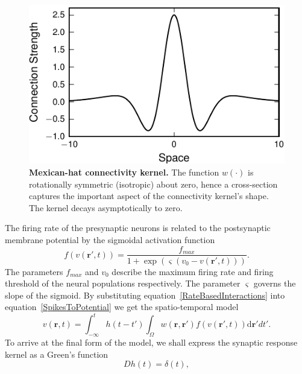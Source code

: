 \documentclass[10pt]{article}
\begin{document}
\begin{figure}
   	\begin{center}
   		\includegraphics{./Graph/Cross_section_kernel.pdf} 
   	\end{center}
   	\caption{{\bf Mexican-hat connectivity kernel.} The function $w(\cdot)$ is rotationally symmetric (isotropic) about zero, hence a cross-section captures the important aspect of the connectivity kernel's shape. The kernel decays asymptotically to zero.}
 	\label{fig:2d_kernel}
   \end{figure}
The firing rate of the presynaptic neurons is related to the postsynaptic membrane potential by the sigmoidal activation function 
\begin{equation}
	\label{ActivationFunction} f\left( v\left( \mathbf{r}', t \right) \right) = \frac{f_{max}}{1 + \exp \left( \varsigma \left( v_0 - v\left(\mathbf{r}',t\right) \right) \right)}. 
\end{equation}
The parameters $f_{max}$ and $v_0$ describe the maximum firing rate and firing threshold of the neural populations respectively. The parameter $\varsigma$ governs the slope of the sigmoid. By substituting equation~\ref{RateBasedInteractions} into equation~\ref{SpikesToPotential} we get the spatio-temporal model 
\begin{equation}
	\label{FullDoubleIntModel} v\left(\mathbf{r},t\right) =
	\int_{-\infty}^t 
	h\left(t - t'\right) \int_\Omega
	w\left(\mathbf{r},\mathbf{r}'\right) 
	f\left( v\left( \mathbf{r}',t \right)\right)
	\textrm{d}\mathbf{r}'dt'.
\end{equation}
To arrive at the final form of the model, we shall express the synaptic response kernel as a Green's function 
\begin{equation}
	\label{GreensFuncDef} Dh\left( t \right) = \delta \left( t \right), 
\end{equation}
\end{document}
